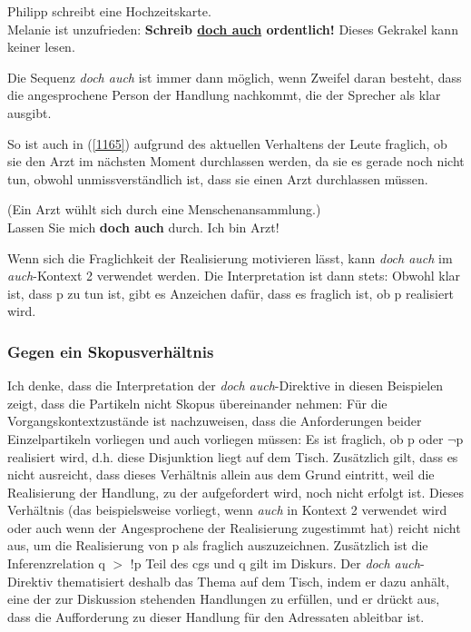 {\begin{exe}
	\ex\label{1164} 
	Philipp schreibt eine Hochzeitskarte.\\
	Melanie ist unzufrieden: \textbf{Schreib \underline{doch auch} ordentlich!} Dieses Gekrakel kann keiner lesen.
\end{exe}
Die Sequenz \textit{doch auch} ist immer dann möglich, wenn Zweifel daran besteht, dass die angesprochene Person der Handlung nachkommt, die der Sprecher als klar ausgibt.

So ist auch in (\ref{1165}) aufgrund des aktuellen Verhaltens der Leute fraglich, ob sie den Arzt im nächsten Moment durchlassen werden, da sie es gerade noch nicht tun, obwohl unmissverständlich ist, dass sie einen Arzt durchlassen müssen.

\begin{exe}
	\ex\label{1165} 
	(Ein Arzt wühlt sich durch eine Menschenansammlung.)\\
	Lassen Sie mich \textbf{doch auch} durch. Ich bin Arzt!
\end{exe}
Wenn sich die Fraglichkeit der Realisierung motivieren lässt, kann \textit{doch auch} im \textit{auch}-Kontext 2 verwendet werden. Die Interpretation ist dann stets: Obwohl klar ist, dass p zu tun ist, gibt es Anzeichen dafür, dass es fraglich ist, ob p realisiert wird.
						  
\subsubsection{Gegen ein Skopusverhältnis}
Ich denke, dass die Interpretation der \textit{doch auch}-Direktive in diesen Beispielen zeigt, dass die Partikeln nicht Skopus  übereinander nehmen: Für die Vorgangskontextzustände ist nachzuweisen, dass die Anforderungen beider Einzelpartikeln vorliegen und auch vorliegen müssen: Es ist fraglich, ob p oder $\neg$p realisiert wird, d.h. diese Disjunktion liegt auf dem Tisch. Zusätzlich gilt, dass es nicht ausreicht, dass dieses Verhältnis allein aus dem Grund eintritt, weil die Realisierung der Handlung, zu der aufgefordert wird, noch nicht erfolgt ist. Dieses Verhältnis (das beispielsweise vorliegt, wenn \textit{auch} in Kontext 2 verwendet wird oder auch wenn der Angesprochene der Realisierung zugestimmt hat) reicht nicht aus, um die Realisierung von p als fraglich auszuzeichnen. Zu\-sätzlich ist die Inferenzrelation  q $>$ !p Teil des cgs und q gilt im Diskurs. Der \textit{doch auch}-Direktiv thematisiert deshalb das Thema auf dem Tisch, indem er dazu anhält, eine der zur Diskussion stehenden Handlungen zu erfüllen, und er drückt aus, dass die Aufforderung zu dieser Handlung für den Adressaten ableitbar ist.

}
